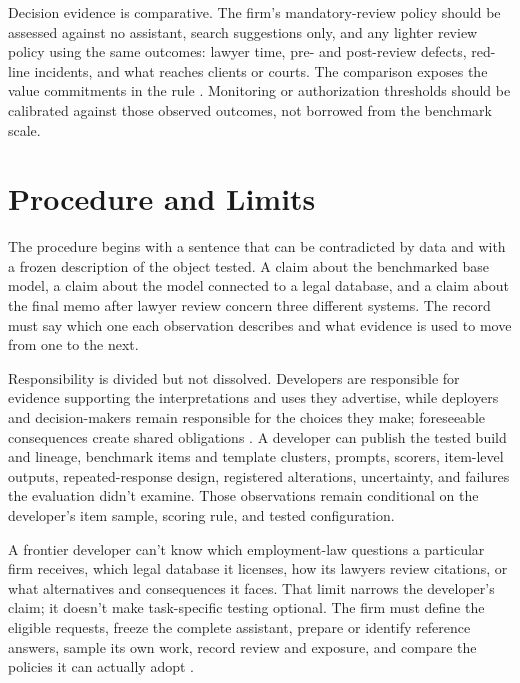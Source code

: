 \documentclass[12pt]{article}
\begin{document}
Decision evidence is comparative. The firm's mandatory-review policy should be assessed against no assistant, search suggestions only, and any lighter review policy using the same outcomes: lawyer time, pre- and post-review defects, red-line incidents, and what reaches clients or courts. The comparison exposes the value commitments in the rule \citep[748]{messick1995Validity}. Monitoring or authorization thresholds should be calibrated against those observed outcomes, not borrowed from the benchmark scale.

\section{Procedure and Limits}\label{sec:workflow}

The procedure begins with a sentence that can be contradicted by data and with a frozen description of the object tested. A claim about the benchmarked base model, a claim about the model connected to a legal database, and a claim about the final memo after lawyer review concern three different systems. The record must say which one each observation describes and what evidence is used to move from one to the next.

Responsibility is divided but not dissolved. Developers are responsible for evidence supporting the interpretations and uses they advertise, while deployers and decision-makers remain responsible for the choices they make; foreseeable consequences create shared obligations \citep[57--58]{kane2013validating}. A developer can publish the tested build and lineage, benchmark items and template clusters, prompts, scorers, item-level outputs, repeated-response design, registered alterations, uncertainty, and failures the evaluation didn't examine. Those observations remain conditional on the developer's item sample, scoring rule, and tested configuration.

A frontier developer can't know which employment-law questions a particular firm receives, which legal database it licenses, how its lawyers review citations, or what alternatives and consequences it faces. That limit narrows the developer's claim; it doesn't make task-specific testing optional. The firm must define the eligible requests, freeze the complete assistant, prepare or identify reference answers, sample its own work, record review and exposure, and compare the policies it can actually adopt \citep[744]{messick1995Validity}.
\end{document}
